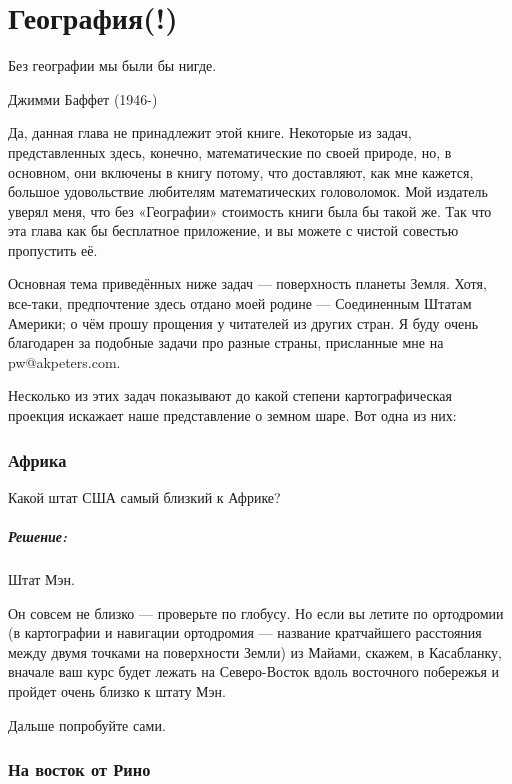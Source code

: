 \chapter*{География(!)}

\epigraph{Без географии  мы были бы нигде.}{Джимми Баффет (1946-)}


Да, данная глава не принадлежит этой книге. %
Некоторые из задач, представленных здесь, конечно, математические по своей природе, %
но,  в основном, они включены в книгу потому, что доставляют, как  мне кажется, большое удовольствие любителям математических головоломок.  Мой издатель уверял меня, что без «Географии» стоимость книги была бы такой же. 
Так что эта глава  как бы бесплатное приложение, и вы можете с чистой совестью  пропустить её.


Основная тема приведённых ниже задач ---  поверхность планеты Земля. Хотя, все-таки, предпочтение здесь отдано моей родине --- Соединенным Штатам Америки;  о чём прошу прощения у читателей из других стран. Я буду очень благодарен за подобные задачи про разные страны, присланные мне на pw@akpeters.com.     


Несколько из этих задач показывают до какой степени %
картографическая проекция %
искажает наше представление о земном шаре. %
Вот одна из них:


\subsection*{Африка}


Какой штат США самый близкий к Африке?


\paragraph{Решение:}  Штат Мэн.\heart
                                  
Он совсем не близко --- проверьте по глобусу.  Но если вы летите по ортодромии  (в картографии и навигации ортодромия --- название кратчайшего расстояния между двумя точками на поверхности Земли)  из Майами, скажем, в Касабланку,  вначале ваш курс %
будет лежать  на Северо-Восток вдоль восточного побережья и пройдет очень близко к штату Мэн.

\medskip

Дальше попробуйте  сами.


\subsection*{На восток от Рино}%


